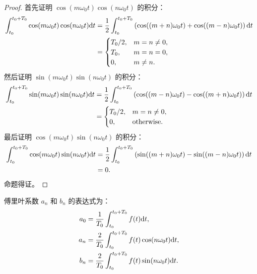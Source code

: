 \begin{proof}
    首先证明 $\cos(m\omega_0 t)\cos(n\omega_0 t)$ 的积分：
    \begin{align*}
        \int_{t_0}^{t_0 + T_0}\cos(m\omega_0 t)\cos(n\omega_0 t)\mathrm{d}t
        & = \frac{1}{2}\int_{t_0}^{t_0 + T_0}\left(\cos((m + n)\omega_0 t) + \cos((m - n)\omega_0 t)\right)\mathrm{d}t \\
        & = \begin{cases}
            T_0 / 2, & m = n \neq 0, \\
            T_0, & m = n = 0, \\
            0, & m \neq n.
        \end{cases}
    \end{align*}
    然后证明 $\sin(m\omega_0 t)\sin(n\omega_0 t)$ 的积分：
    \begin{align*}
        \int_{t_0}^{t_0 + T_0}\sin(m\omega_0 t)\sin(n\omega_0 t)\mathrm{d}t
        & = \frac{1}{2}\int_{t_0}^{t_0 + T_0}\left(\cos((m - n)\omega_0 t) - \cos((m + n)\omega_0 t)\right)\mathrm{d}t \\
        & = \begin{cases}
            T_0 / 2, & m = n \neq 0, \\
            0, & \text{otherwise}.
        \end{cases}
    \end{align*}
    最后证明 $\cos(m\omega_0 t)\sin(n\omega_0 t)$ 的积分：
    \begin{align*}
        \int_{t_0}^{t_0 + T_0}\cos(m\omega_0 t)\sin(n\omega_0 t)\mathrm{d}t
        & = \frac{1}{2}\int_{t_0}^{t_0 + T_0}\left(\sin((m + n)\omega_0 t) - \sin((m - n)\omega_0 t)\right)\mathrm{d}t \\
        & = 0.
    \end{align*}
    命题得证。
\end{proof}

\begin{corollary}
    傅里叶系数 $a_n$ 和 $b_n$ 的表达式为：
    \begin{align*}
        a_0 & = \frac{1}{T_0}\int_{t_0}^{t_0 + T_0}f(t)\mathrm{d}t, \\
        a_n & = \frac{2}{T_0}\int_{t_0}^{t_0 + T_0}f(t)\cos(n\omega_0 t)\mathrm{d}t, \\
        b_n & = \frac{2}{T_0}\int_{t_0}^{t_0 + T_0}f(t)\sin(n\omega_0 t)\mathrm{d}t.
    \end{align*}
\end{corollary}


